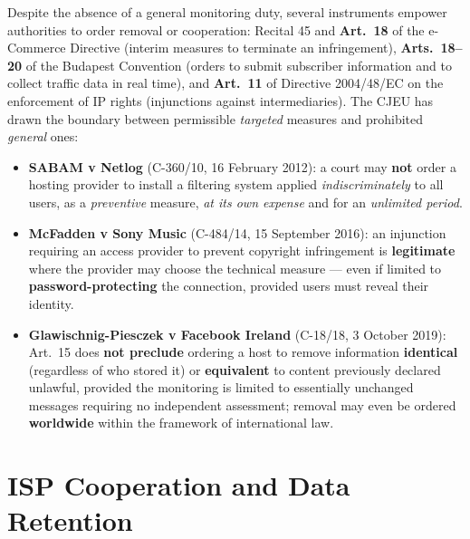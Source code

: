 \documentclass[11pt,a4paper,openany]{report}
\theoremstyle{definition}
\theoremstyle{plain}
\theoremstyle{remark}
\begin{document}
Despite the absence of a general monitoring duty, several instruments empower authorities to order removal or cooperation: Recital 45 and \textbf{Art.\ 18} of the e-Commerce Directive (interim measures to terminate an infringement), \textbf{Arts.\ 18--20} of the Budapest Convention (orders to submit subscriber information and to collect traffic data in real time), and \textbf{Art.\ 11} of Directive 2004/48/EC on the enforcement of IP rights (injunctions against intermediaries). The CJEU has drawn the boundary between permissible \emph{targeted} measures and prohibited \emph{general} ones:
\begin{itemize}
    \item \textbf{SABAM v Netlog} (C-360/10, 16 February 2012): a court may \textbf{not} order a hosting provider to install a filtering system applied \emph{indiscriminately} to all users, as a \emph{preventive} measure, \emph{at its own expense} and for an \emph{unlimited period}.
    \item \textbf{McFadden v Sony Music} (C-484/14, 15 September 2016): an injunction requiring an access provider to prevent copyright infringement is \textbf{legitimate} where the provider may choose the technical measure --- even if limited to \textbf{password-protecting} the connection, provided users must reveal their identity.
    \item \textbf{Glawischnig-Piesczek v Facebook Ireland} (C-18/18, 3 October 2019): Art.\ 15 does \textbf{not preclude} ordering a host to remove information \textbf{identical} (regardless of who stored it) or \textbf{equivalent} to content previously declared unlawful, provided the monitoring is limited to essentially unchanged messages requiring no independent assessment; removal may even be ordered \textbf{worldwide} within the framework of international law.
\end{itemize}

\section{ISP Cooperation and Data Retention}
\end{document}
